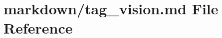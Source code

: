 \hypertarget{tag__vision_8md}{}\section{markdown/tag\+\_\+vision.md File Reference}
\label{tag__vision_8md}
